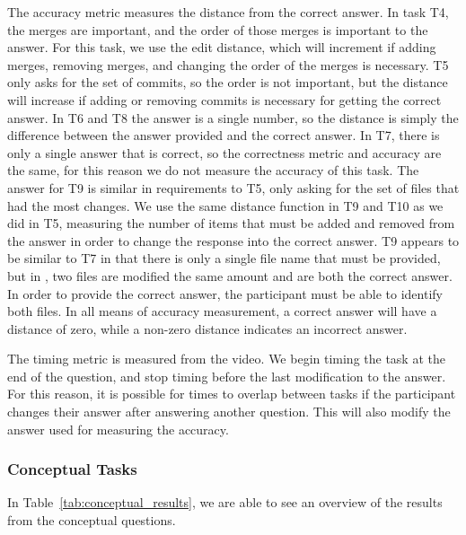 The accuracy metric measures the distance from the correct
answer. In task T4, the merges are important, and the order of those
merges is important to the answer. For this task, we use the edit
distance, which will increment if adding merges, removing merges, and
changing the order of the merges is necessary. T5 only asks for the set
of commits, so the order is not important, but the distance will
increase if adding or removing commits is necessary for getting the
correct answer. In T6 and T8 the answer is a single number, so the
distance is simply the difference between the answer provided and the
correct answer. In T7, there is only a single answer that is correct, so
the correctness metric and accuracy are the same, for this reason we do
not measure the accuracy of this task. The answer for T9 is similar in
requirements to T5, only asking for the set of files that had the most
changes. We use the same distance function in T9 and T10 as we did in
T5, measuring the number of items that must be added and removed from
the answer in order to change the response into the correct answer. %
T9 appears to be similar to T7 in that there is only a single file name
that must be provided, but in \comA, two files are modified the same
amount and are both the correct answer. In order to provide the correct
answer, the participant must be able to identify both files. In all
means of accuracy measurement, a correct answer will have a distance of
zero, while a non-zero distance indicates an incorrect answer.

The timing metric is measured from the video. We begin timing the task
at the end of the question, and stop timing before the last modification
to the answer. For this reason, it is possible for times to overlap
between tasks if the participant changes their answer after answering
another question. This will also modify the answer used for measuring
the accuracy.

\subsubsection{Conceptual Tasks}
\label{sub:conceptual_tasks}

In Table~\ref{tab:conceptual_results}, we are able to see an overview of
the results from the conceptual questions.


